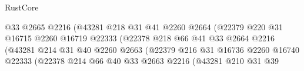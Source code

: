 \begin{lexlean}{RustCore}
\begin{coremodule}
                                            @33
                                            @2665
                                            @2216
                                            (@43281
                                              @218
                                              @31
                                              @41
                                              @2260
                                              @2664
                                              (@22379
                                                @220
                                                @31
                                                @16715
                                                @2260
                                                @16719
                                                @22333
                                                (@22378
                                                  @218
                                                  @66
                                                  @41
                                                  @33
                                                  @2664
                                                  @2216
                                                  (@43281
                                                    @214
                                                    @31
                                                    @40
                                                    @2260
                                                    @2663
                                                    (@22379
                                                      @216
                                                      @31
                                                      @16736
                                                      @2260
                                                      @16740
                                                      @22333
                                                      (@22378
                                                        @214
                                                        @66
                                                        @40
                                                        @33
                                                        @2663
                                                        @2216
                                                        (@43281
                                                          @210
                                                          @31
                                                          @39

\end{coremodule}
\end{lexlean}
